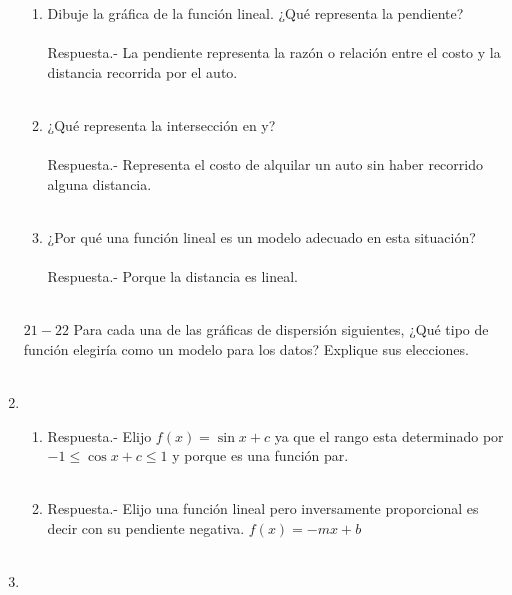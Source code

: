 \begin{enumerate}
\begin{enumerate}[\bfseries (a)]
	\item Dibuje la gráfica de la función lineal. ¿Qué representa la pendiente?\\\\
	    Respuesta.-\; La pendiente representa la razón o relación entre el costo y la distancia recorrida por el auto.\\\\

	\item ¿Qué representa la intersección en y?\\\\
	    Respuesta.-\; Representa el costo de alquilar un auto sin haber recorrido alguna distancia.\\\\

	\item ¿Por qué una función lineal es un modelo adecuado en esta situación?\\\\
	    Respuesta.-\; Porque la distancia es lineal.\\\\

    \end{enumerate}

    $21-22$ Para cada una de las gráficas de dispersión siguientes, ¿Qué tipo de función elegiría como un modelo para los datos? Explique sus elecciones.\\\\

    \item
    \begin{enumerate}[\bfseries (a)]

	\item  Respuesta.-\; Elijo $f(x) = \sin x + c$ ya que el rango esta determinado por $-1 \leq \cos x + c \leq 1$ y porque es una función par.\\\\

	\item Respuesta.-\; Elijo una función lineal pero inversamente proporcional es decir con su pendiente negativa. $f(x)=-mx + b$\\\\

    \end{enumerate}

    \item 
    \begin{enumerate}[\bfseries (a)]
	

\end{enumerate}
\end{enumerate}
